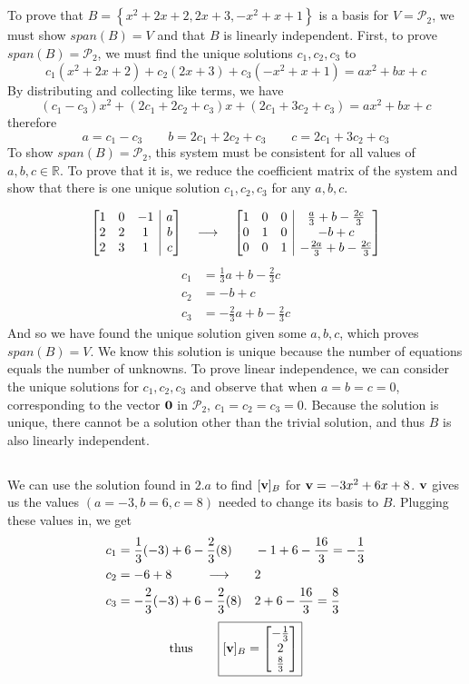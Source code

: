 \documentclass[]{article}
\makeatletter
\newenvironment{augmx}[1]{%
	\left[\begin{array}{@{}*{#1}{c}|c@{}}
	}{%
	\end{array}\right]
}
\newcommand{\reals}{\mathbb{R}}
\newcommand{\bmat}[1]{\begin{bmatrix}#1\end{bmatrix}}
\makeatother
\begin{document}
\subsection{}
To prove that $B = \left\{ x^2+2x+2,2x+3,-x^2+x+1 \right\}$ is a basis for $V = \mathcal{P}_2$, we must show $span(B) = V$ and that $B$ is linearly independent. First, to prove $span(B) = \mathcal{P}_2$, we must find the unique solutions $c_1,c_2,c_3$ to 
\[ c_1(x^2+2x+2) + c_2(2x+3) + c_3(-x^2+x+1) = ax^2 + bx + c \]
By distributing and collecting like terms, we have
\[ (c_1-c_3)x^2 + (2c_1 + 2c_2 + c_3)x + (2c_1 + 3c_2 + c_3) = ax^2 + bx + c \]
therefore
\[ a = c_1 - c_3 \qquad b = 2c_1 + 2c_2 + c_3 \qquad c = 2c_1 + 3c_2 + c_3 \]
To show $span(B) = \mathcal{P}_2$, this system must be consistent for all values of $a, b, c \in \reals$. To prove that it is, we reduce the coefficient matrix of the system and show that there is one unique solution $c_1,c_2,c_3$ for any $a, b, c$.

\[ \begin{augmx}{3}1&0&-1&a\\2&2&1&b\\2&3&1&c\end{augmx} \quad \longrightarrow \quad \begin{augmx}{3}1&0&0&\frac{a}{3} + b - \frac{2c}{3}\\0&1&0&-b+c\\0&0&1&-\frac{2a}{3}+b-\frac{2c}{3}\end{augmx} \]
\begin{align*}
	c_1 &= \frac{1}{3}a + b - \frac{2}{3}c\\
	c_2 &= -b + c\\
	c_3 &= -\frac{2}{3}a + b - \frac{2}{3}c
\end{align*}
And so we have found the unique solution given some $a,b,c$, which proves $span(B) = V$. We know this solution is unique because the number of equations equals the number of unknowns. To prove linear independence, we can consider the unique solutions for $c_1,c_2,c_3$ and observe that when $a=b=c=0$, corresponding to the vector $\vb{0}$ in $\mathcal{P}_2$, $c_1=c_2=c_3=0$. Because the solution is unique, there cannot be a solution other than the trivial solution, and thus $B$ is also linearly independent.
\subsection{}
We can use the solution found in $2.a$ to find $[\vb{v}]_B$ for $\vb{v} = -3x^2 + 6x + 8$. $\vb{v}$ gives us the values $(a=-3,b=6,c=8)$ needed to change its basis to $B$. Plugging these values in, we get
\begin{align*}
	c_1 &= \frac{1}{3}(-3) + 6 - \frac{2}{3}(8)&& -1 + 6 - \frac{16}{3} = -\frac{1}{3}\\
	c_2 &= -6 + 8&\hspace{-4em} \longrightarrow \qquad& 2\\
	c_3 &= -\frac{2}{3}(-3) + 6 - \frac{2}{3}(8)&&2 + 6 - \frac{16}{3} = \frac{8}{3}
\end{align*}
\[ \text{thus} \qquad \boxed{[\vb{v}]_B = \bmat{-\frac{1}{3}\\2\\\frac{8}{3}}}\]
\end{document}
